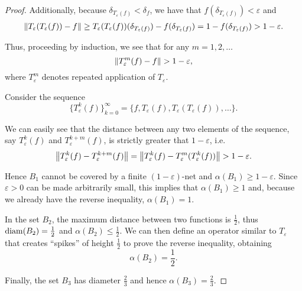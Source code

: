 \begin{proof}
  Additionally, because \( \delta_{T_\varepsilon(f)} < \delta_f \), we have that \( f(\delta_{T_\varepsilon(f)}) < \varepsilon \) and
  \begin{align*}
    \left\Vert T_\varepsilon(T_\varepsilon(f)) - f \right\Vert
    \geq
    T_\varepsilon(T_\varepsilon(f)) (\delta_{T_\varepsilon(f)}) - f(\delta_{T_\varepsilon(f)})
    =
    1 - f(\delta_{T_\varepsilon(f)})
    >
    1 - \varepsilon.
  \end{align*}

  Thus, proceeding by induction, we see that for any \( m = 1, 2, \ldots \)
  \begin{equation*}
    \left\Vert T_\varepsilon^m(f) - f \right\Vert > 1 - \varepsilon,
  \end{equation*}
  where \( T_\varepsilon^m \) denotes repeated application of \( T_\varepsilon \).

  Consider the sequence
  \begin{equation*}
    \{ T_\varepsilon^k(f) \}_{k=0}^\infty = \{ f, T_\varepsilon(f), T_\varepsilon(T_\varepsilon(f)), \ldots \}.
  \end{equation*}

  We can easily see that the distance between any two elements of the sequence, say \( T_\varepsilon^k(f) \) and \( T_\varepsilon^{k+m}(f) \), is strictly greater that \( 1 - \varepsilon \), i.e.
  \begin{align*}
    \left\Vert T_\varepsilon^k(f) - T_\varepsilon^{k+m}(f) \right\Vert
    =
    \left\Vert T_\varepsilon^k(f) - T_\varepsilon^m(T_\varepsilon^k(f)) \right\Vert
    >
    1 - \varepsilon.
  \end{align*}

  Hence \( B_1 \) cannot be covered by a finite \( (1-\varepsilon) \)-net and \( \alpha(B_1) \geq 1 - \varepsilon \). Since \( \varepsilon > 0 \) can be made arbitrarily small, this implies that \( \alpha(B_1) \geq 1 \) and, because we already have the reverse inequality, \( \alpha(B_1) = 1 \).

  In the set \( B_2 \), the maximum distance between two functions is \( \frac 1 2 \), thus \( \operatorname{diam}(B_2) = \frac 1 2 \) and \( \alpha(B_2) \leq \frac 1 2 \). We can then define an operator similar to \( T_\varepsilon \) that creates \enquote{spikes} of height \( \frac 1 2 \) to prove the reverse inequality, obtaining
  \begin{equation*}
    \alpha(B_2) = \frac 1 2.
  \end{equation*}

  Finally, the set \( B_3 \) has diameter \( \frac 2 3 \) and hence \( \alpha(B_3) = \frac 2 3 \).


\end{proof}
